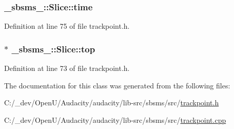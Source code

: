 \subsubsection[{\texorpdfstring{time}{time}}]{ \+\_\+sbsms\+\_\+\+::\+Slice\+::time}\hypertarget{class__sbsms___1_1_slice_a6db6a21e4d624e41a776479d1b4cd945}{}\label{class__sbsms___1_1_slice_a6db6a21e4d624e41a776479d1b4cd945}


Definition at line 75 of file trackpoint.\+h.

\subsubsection[{\texorpdfstring{top}{top}}]{$\ast$ \+\_\+sbsms\+\_\+\+::\+Slice\+::top}\hypertarget{class__sbsms___1_1_slice_a920cc2ff120fac53654c384aeb8b6826}{}\label{class__sbsms___1_1_slice_a920cc2ff120fac53654c384aeb8b6826}


Definition at line 73 of file trackpoint.\+h.



The documentation for this class was generated from the following files\+:\begin{DoxyCompactItemize}
\item 
C\+:/\+\_\+dev/\+Open\+U/\+Audacity/audacity/lib-\/src/sbsms/src/\hyperlink{trackpoint_8h}{trackpoint.\+h}\item 
C\+:/\+\_\+dev/\+Open\+U/\+Audacity/audacity/lib-\/src/sbsms/src/\hyperlink{trackpoint_8cpp}{trackpoint.\+cpp}\end{DoxyCompactItemize}
